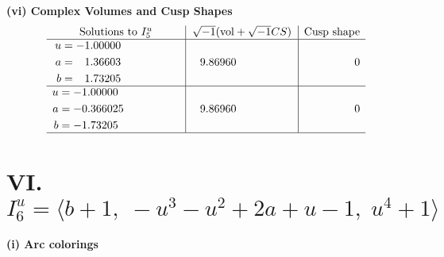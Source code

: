\documentclass[1p]{elsarticle_modified}
\theoremstyle{definition}
\newcommand{\I}{\sqrt{-1}}
\begin{document}
\newpage\flushleft \textbf{(vi) Complex Volumes and Cusp Shapes}
$$\begin{array}{c|c|c}  
\text{Solutions to }I^u_{5}& \I (\text{vol} + \sqrt{-1}CS) & \text{Cusp shape}\\
 \hline 
\begin{aligned}
u &= -1.00000\phantom{ +0.000000I} \\
a &= \phantom{-}1.36603\phantom{ +0.000000I} \\
b &= \phantom{-}1.73205\phantom{ +0.000000I}\end{aligned}
 & \phantom{-}9.86960\phantom{ +0.000000I} & \phantom{-0.000000 } 0 \\ \hline\begin{aligned}
u &= -1.00000\phantom{ +0.000000I} \\
a &= -0.366025\phantom{ +0.000000I} \\
b &= -1.73205\phantom{ +0.000000I}\end{aligned}
 & \phantom{-}9.86960\phantom{ +0.000000I} & \phantom{-0.000000 } 0\\
 \hline 
 \end{array}$$\newpage\newpage\renewcommand{\arraystretch}{1}
\centering \section*{VI. $I^u_{6}= \langle b+1,\;- u^3- u^2+2 a+u-1,\;u^4+1 \rangle$}
\flushleft \textbf{(i) Arc colorings}\\
\end{document}
